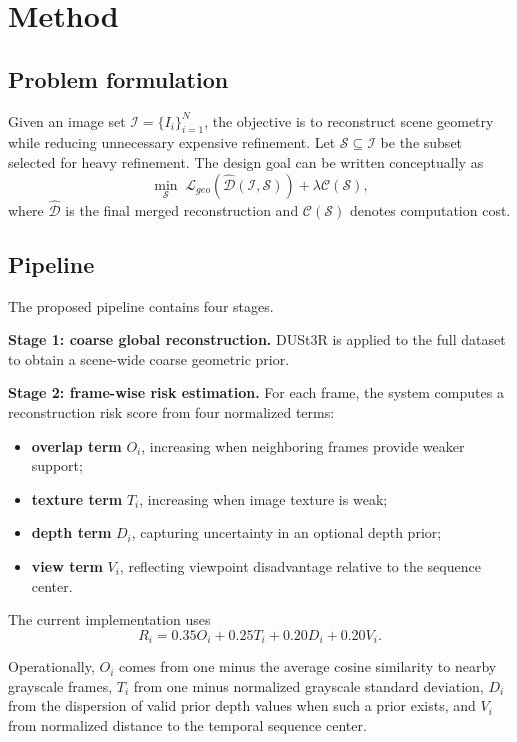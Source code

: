 \documentclass[preprint,12pt]{elsarticle}
\begin{document}
\section{Method}

\subsection{Problem formulation}

Given an image set $\mathcal{I}=\{I_i\}_{i=1}^{N}$, the objective is to reconstruct scene geometry while reducing unnecessary expensive refinement. Let $\mathcal{S}\subseteq \mathcal{I}$ be the subset selected for heavy refinement. The design goal can be written conceptually as
\[
\min_{\mathcal{S}} \; \mathcal{L}_{geo}(\hat{\mathcal{D}}(\mathcal{I},\mathcal{S})) + \lambda \mathcal{C}(\mathcal{S}),
\]
where $\hat{\mathcal{D}}$ is the final merged reconstruction and $\mathcal{C}(\mathcal{S})$ denotes computation cost.

\subsection{Pipeline}

The proposed pipeline contains four stages.

\textbf{Stage 1: coarse global reconstruction.}
DUSt3R is applied to the full dataset to obtain a scene-wide coarse geometric prior.

\textbf{Stage 2: frame-wise risk estimation.}
For each frame, the system computes a reconstruction risk score from four normalized terms:
\begin{itemize}[leftmargin=1.5em]
  \item \textbf{overlap term} $O_i$, increasing when neighboring frames provide weaker support;
  \item \textbf{texture term} $T_i$, increasing when image texture is weak;
  \item \textbf{depth term} $D_i$, capturing uncertainty in an optional depth prior;
  \item \textbf{view term} $V_i$, reflecting viewpoint disadvantage relative to the sequence center.
\end{itemize}

The current implementation uses
\[
R_i = 0.35 O_i + 0.25 T_i + 0.20 D_i + 0.20 V_i.
\]

Operationally, $O_i$ comes from one minus the average cosine similarity to nearby grayscale frames, $T_i$ from one minus normalized grayscale standard deviation, $D_i$ from the dispersion of valid prior depth values when such a prior exists, and $V_i$ from normalized distance to the temporal sequence center.
\end{document}
